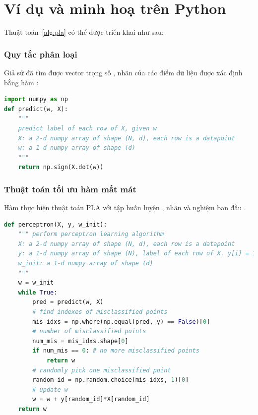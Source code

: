 \section{Ví dụ và minh hoạ trên Python}
Thuật toán~\ref{alg:pla} có thể được triển khai như sau:

\subsubsection{Quy tắc phân loại}
Giả sử đã tìm được vector trọng số , nhãn của các điểm dữ liệu  được xác định bằng hàm :
\begin{lstlisting}[language=Python]
import numpy as np
def predict(w, X):
    """
    predict label of each row of X, given w
    X: a 2-d numpy array of shape (N, d), each row is a datapoint
    w: a 1-d numpy array of shape (d)
    """
    return np.sign(X.dot(w))
\end{lstlisting}
\subsubsection{Thuật toán tối ưu hàm mất mát}
Hàm  thực hiện thuật toán PLA với tập
huấn luyện , nhãn  và nghiệm ban đầu
.

\begin{lstlisting}[language=Python]
def perceptron(X, y, w_init):
    """ perform perceptron learning algorithm
    X: a 2-d numpy array of shape (N, d), each row is a datapoint
    y: a 1-d numpy array of shape (N), label of each row of X. y[i] = 1/-1
    w_init: a 1-d numpy array of shape (d)
    """
    w = w_init
    while True:
        pred = predict(w, X)
        # find indexes of misclassified points
        mis_idxs = np.where(np.equal(pred, y) == False)[0]
        # number of misclassified points
        num_mis = mis_idxs.shape[0]
        if num_mis == 0: # no more misclassified points
            return w
        # randomly pick one misclassified point
        random_id = np.random.choice(mis_idxs, 1)[0]
        # update w
        w = w + y[random_id]*X[random_id]
    return w
\end{lstlisting}


